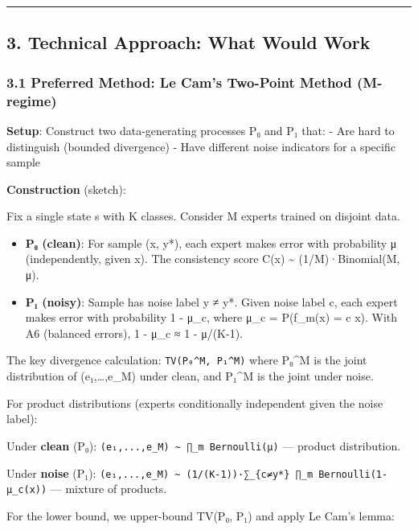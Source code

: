 \documentclass[
  12pt,
]{article}
\providecommand{\tightlist}{%
  \setlength{\itemsep}{0pt}\setlength{\parskip}{0pt}}
\begin{document}
\begin{center}\rule{0.5\linewidth}{0.5pt}\end{center}

\subsection{3. Technical Approach: What Would
Work}\label{technical-approach-what-would-work}

\subsubsection{3.1 Preferred Method: Le Cam's Two-Point Method
(M-regime)}\label{preferred-method-le-cams-two-point-method-m-regime}

\textbf{Setup}: Construct two data-generating processes P₀ and P₁ that:
- Are hard to distinguish (bounded divergence) - Have different noise
indicators for a specific sample

\textbf{Construction} (sketch):

Fix a single state s with K classes. Consider M experts trained on
disjoint data.

\begin{itemize}
\tightlist
\item
  \textbf{P₀ (clean)}: For sample (x, y*), each expert makes error with
  probability μ (independently, given x). The consistency score C(x)
  \textasciitilde{} (1/M)·Binomial(M, μ).
\item
  \textbf{P₁ (noisy)}: Sample has noise label y ≠ y*. Given noise label
  c, each expert makes error with probability 1 - μ\_c, where μ\_c =
  P(f\_m(x) = c \textbar{} x). With A6 (balanced errors), 1 - μ\_c ≈ 1 -
  μ/(K-1).
\end{itemize}

The key divergence calculation: \texttt{TV(P₀\^{}M,\ P₁\^{}M)} where
P₀\^{}M is the joint distribution of (e₁,\ldots,e\_M) under clean, and
P₁\^{}M is the joint under noise.

For product distributions (experts conditionally independent given the
noise label):

Under \textbf{clean} (P₀):
\texttt{(e₁,...,e\_M)\ \textasciitilde{}\ ∏\_m\ Bernoulli(μ)} ---
product distribution.

Under \textbf{noise} (P₁):
\texttt{(e₁,...,e\_M)\ \textasciitilde{}\ (1/(K-1))·∑\_\{c≠y*\}\ ∏\_m\ Bernoulli(1-μ\_c(x))}
--- mixture of products.

For the lower bound, we upper-bound TV(P₀, P₁) and apply Le Cam's lemma:
\end{document}
